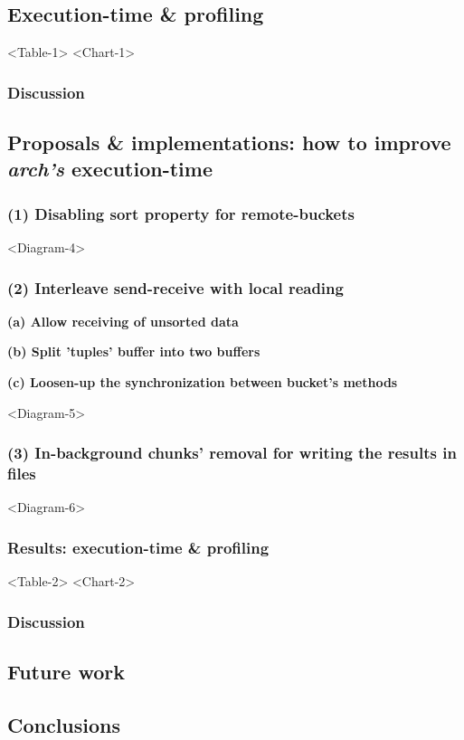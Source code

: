 % 
\subsection{Execution-time \& profiling}


<Table-1>
<Chart-1>

% 
\subsubsection*{Discussion}

% 
\subsection{Proposals \& implementations: how to improve \textit{arch's} execution-time}

% 
\subsubsection*{(1) Disabling sort property for remote-buckets}

<Diagram-4>

% 
\subsubsection*{(2) Interleave send-receive with local reading}

\textbf{(a) Allow receiving of unsorted data}

\textbf{(b) Split 'tuples' buffer into two buffers}

\textbf{(c) Loosen-up the synchronization between bucket's methods}

<Diagram-5>

% 
\subsubsection*{(3) In-background chunks' removal for writing the results in files}

<Diagram-6>

% 
\subsubsection{Results: execution-time \& profiling}

<Table-2>
<Chart-2>

% 
\subsubsection*{Discussion}

\subsection{Future work}

\subsection{Conclusions}
